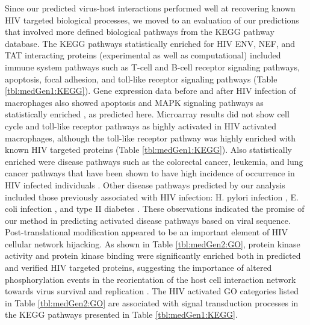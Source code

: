 

Since our predicted virus-host interactions performed well at
recovering known HIV targeted biological processes, we moved to an
evaluation of our predictions that involved more defined biological
pathways from the KEGG pathway database. The KEGG pathways
statistically enriched for HIV ENV, NEF, and TAT interacting proteins
(experimental as well as computational) included immune system
pathways such as T-cell and B-cell receptor signaling pathways,
apoptosis, focal adhesion, and toll-like receptor signaling pathways
(Table \ref{tbl:medGen1:KEGG}). Gene expression data before and after
HIV infection of macrophages also showed apoptosis and MAPK signaling
pathways as statistically enriched \cite{brown08}, as predicted
here. Microarray results did not show cell cycle and toll-like
receptor pathways as highly activated in HIV activated macrophages,
although the toll-like receptor pathway was highly enriched with known
HIV targeted proteins (Table \ref{tbl:medGen1:KEGG}). Also
statistically enriched were disease pathways such as the colorectal
cancer, leukemia, and lung cancer pathways that have been shown to
have high incidence of occurrence in HIV infected individuals
\cite{patel08}. Other disease pathways predicted by our analysis
included those previously associated with HIV infection: H. pylori
infection \cite{panos07}, E. coli infection \cite{ramakrishna99}, and
type II diabetes \cite{panz99}. These observations indicated the
promise of our method in predicting activated disease pathways based
on viral sequence. Post-translational modification appeared to be an
important element of HIV cellular network hijacking. As shown in Table
\ref{tbl:medGen2:GO}, protein kinase activity and protein kinase
binding were significantly enriched both in predicted and verified HIV
targeted proteins, suggesting the importance of altered
phosphorylation events in the reorientation of the host cell
interaction network towards virus survival and replication
\cite{brown08}. The HIV activated GO categories listed in Table
\ref{tbl:medGen2:GO} are associated with signal transduction processes
in the KEGG pathways presented in Table \ref{tbl:medGen1:KEGG}.

